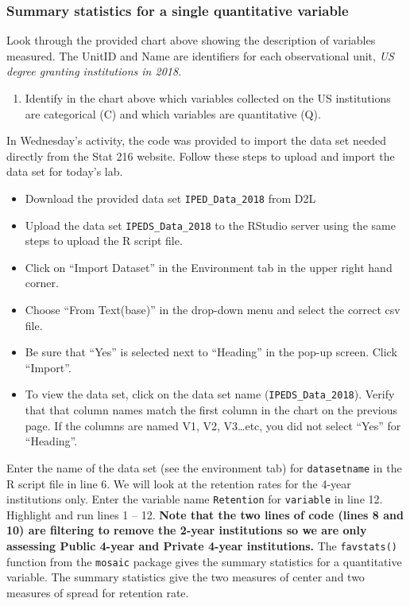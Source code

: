 \documentclass[
]{report}
\providecommand{\tightlist}{%
  \setlength{\itemsep}{0pt}\setlength{\parskip}{0pt}}
\begin{document}
\hypertarget{summary-statistics-for-a-single-quantitative-variable}{%
\subsubsection*{Summary statistics for a single quantitative variable}\label{summary-statistics-for-a-single-quantitative-variable}}

Look through the provided chart above showing the description of variables measured. The UnitID and Name are identifiers for each observational unit, \emph{US degree granting institutions in 2018}.

\begin{enumerate}
\def\labelenumi{\arabic{enumi}.}
\tightlist
\item
  Identify in the chart above which variables collected on the US institutions are categorical (C) and which variables are quantitative (Q).
\end{enumerate}

\newpage

In Wednesday's activity, the code was provided to import the data set needed directly from the Stat 216 website. Follow these steps to upload and import the data set for today's lab.

\begin{itemize}
\item
  Download the provided data set \texttt{IPED\_Data\_2018} from D2L
\item
  Upload the data set \texttt{IPEDS\_Data\_2018} to the RStudio server using the same steps to upload the R script file.
\item
  Click on ``Import Dataset'' in the Environment tab in the upper right hand corner.
\item
  Choose ``From Text(base)'' in the drop-down menu and select the correct csv file.
\item
  Be sure that ``Yes'' is selected next to ``Heading'' in the pop-up screen. Click ``Import''.
\item
  To view the data set, click on the data set name (\texttt{IPEDS\_Data\_2018}). Verify that that column names match the first column in the chart on the previous page. If the columns are named V1, V2, V3\ldots etc, you did not select ``Yes'' for ``Heading''.
\end{itemize}

Enter the name of the data set (see the environment tab) for \texttt{datasetname} in the R script file in line 6. We will look at the retention rates for the 4-year institutions only. Enter the variable name \texttt{Retention} for \texttt{variable} in line 12. Highlight and run lines 1 -- 12. \textbf{Note that the two lines of code (lines 8 and 10) are filtering to remove the 2-year institutions so we are only assessing Public 4-year and Private 4-year institutions.} The \texttt{favstats()} function from the \texttt{mosaic} package gives the summary statistics for a quantitative variable. The summary statistics give the two measures of center and two measures of spread for retention rate.
\end{document}
